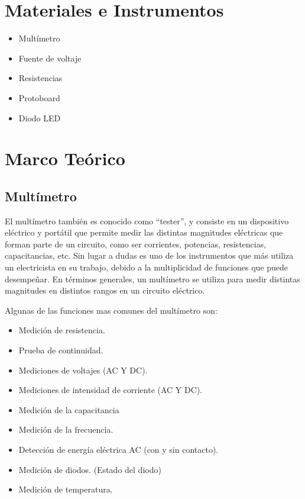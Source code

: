 \documentclass{article}
\begin{document}
    \section{Materiales e Instrumentos}

    \begin{itemize}
        \item Multímetro
        \item Fuente de voltaje
        \item Resistencias
        \item Protoboard
        \item Diodo LED
    \end{itemize}

    \section{Marco Teórico}

    \subsection*{Multímetro}
    El multímetro también es conocido como “tester”, y consiste en un dispositivo eléctrico y portátil que permite medir las distintas magnitudes eléctricas que forman parte de un circuito, como ser corrientes, potencias, resistencias, capacitancias, etc. Sin lugar a dudas es uno de los instrumentos que más utiliza un electricista en su trabajo, debido a la multiplicidad de funciones que puede desempeñar. En términos generales, un multímetro se utiliza para medir distintas magnitudes en distintos rangos en un circuito eléctrico.


    Algunas de las funciones mas comunes del multímetro son:
    \begin{itemize}
        \item Medición de resistencia.
        \item Prueba de continuidad.
        \item Mediciones de voltajes (AC Y DC).
        \item Mediciones de intensidad de corriente (AC Y DC).
        \item Medición de la capacitancia
        \item Medición de la frecuencia.
        \item Detección de energía eléctrica AC (con y sin contacto).
        \item Medición de diodos. (Estado del diodo)
        \item Medición de temperatura.
    \end{itemize}
\end{document}
